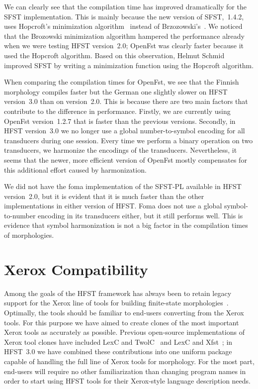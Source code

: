\documentclass{llncs}
\begin{document}
We can clearly see that the compilation time has improved dramatically
for the SFST implementation.
This is mainly because the new version of SFST,~1.4.2, uses Hopcroft's
minimization algorithm~\cite{hopcroft/1971} instead of 
Brzozowski's~\cite{brzozowski/1964}. 
We noticed that the Brozowski minimization algorithm hampered the performance
already when we were testing HFST version~2.0; 
OpenFst was clearly faster because it used the Hopcroft algorithm. 
Based on this observation, Helmut Schmid improved SFST by 
writing a minimization function using the Hopcroft algorithm.

When comparing the compilation times for OpenFst, we see that the
Finnish morphology compiles faster but the German one slightly slower
on HFST version~3.0 than on version~2.0. This is because there are two
main factors that contribute to the difference in performance. Firstly, we
are currently using OpenFst version~1.2.7 that is faster than the
previous versions. Secondly, in HFST version~3.0 we no longer use a
global number-to-symbol encoding for all transducers during one
session. Every time we perform a binary operation on two transducers,
we harmonize the encodings of the transducers. Nevertheless, 
it seems that the newer, more efficient version of 
OpenFst mostly compensates for this additional effort caused by harmonization. 

We did not have the foma implementation of the SFST-PL 
available in HFST version~2.0, but it is evident that it is much faster than the other
implementations in either version of HFST. Foma does not use
a global symbol-to-number encoding in its transducers either, but it still
performs well. This is evidence that symbol harmonization is not a big
factor in the compilation times of morphologies. 


\section{Xerox Compatibility}\label{hfst:xerox-compatibility}
Among the goals of the HFST framework has always been to retain legacy support
for the Xerox line of tools for building finite-state
morphologies~\cite{beesley/2003}. Optimally, the tools should be familiar
to end-users converting from the Xerox tools. For this purpose we have aimed to
create clones of the most important Xerox tools as accurately as possible.
Previous open-source implementations of Xerox tool clones have included
LexC and TwolC~\cite{linden/2009/sfcm} and LexC and Xfst~\cite{hulden/2009}; in
HFST~3.0 we have combined these contributions into one uniform package capable of
handling the full line of Xerox tools for morphology. For the most part,
end-users will require no other familiarization than changing program names in
order to start using HFST tools for their Xerox-style language description
needs.
\end{document}

